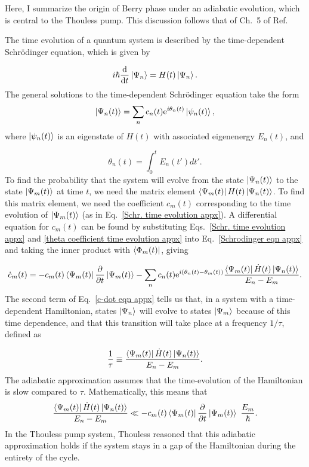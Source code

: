 \documentclass[double,12pt,1in,seploa]{beavtex}
\begin{document}
Here, I summarize the origin of Berry phase under an adiabatic evolution, which is central to the Thouless pump. This discussion follows that of Ch.\ 5 of Ref.\ \cite{sakurai_modern_1985}

The time evolution of a quantum system is described by the time-dependent Schrödinger equation, which is given by

\begin{equation}
    i \hbar \derivative{t}\ket{\Psi_n} = H(t)\ket{\Psi_n}. \label{Schrodinger eqn appx}
\end{equation}
The general solutions to the time-dependent Schrödinger equation take the form
\begin{equation}
    \ket{\Psi_n(t)} = \sum_n c_n(t) \mathrm{e}^{i \theta_n(t)} \ket{\psi_n(t)}, \label{Schr. time evolution appx}
\end{equation}
where $\ket{\psi_n(t)}$ is an eigenstate of $H(t)$ with associated eigenenergy $E_n(t)$, and 

\begin{equation}
    \theta_n(t) = \int_{0}^{t}E_n(t')dt'. \label{theta coefficient time evolution appx}
\end{equation}
To find the probability that the system will evolve from the state $\ket{\Psi_n(t)}$ to the state $\ket{\Psi_m(t)}$ at time $t$, we need the matrix element $\bra{\Psi_m(t)}H(t)\ket{\Psi_n(t)}$. To find this matrix element, we need the coefficient $c_m(t)$ corresponding to the time evolution of $\ket{\Psi_m(t)}$ (as in Eq.\ \ref{Schr. time evolution appx}). A differential equation for $c_m(t)$ can be found by substituting Eqs.\ \ref{Schr. time evolution appx} and \ref{theta coefficient time evolution appx} into Eq.\ \ref{Schrodinger eqn appx} and taking the inner product with $\bra{\Phi_m(t)}$, giving \cite[p.\ 347]{sakurai_modern_1985}

\begin{equation}
    \dot{c}_m(t) = - c_m(t) \bra{\Psi_m(t)}\pdv{t}\ket{\Psi_m(t)} - \sum_n c_n(t) \mathrm{e}^{i (\theta_n(t) - \theta_m(t))} \frac{\bra{\Psi_m(t)}\dot{H}(t)\ket{\Psi_n(t)}}{E_n - E_m}. \label{c-dot eqn appx}
\end{equation}
The second term of Eq.\ \ref{c-dot eqn appx} tells us that, in a system with a time-dependent Hamiltonian, states $\ket{\Psi_n}$ will evolve to states $\ket{\Psi_m}$ because of this time dependence, and that this transition will take place at a frequency $1/\tau$, defined as 

\begin{equation}
    \frac{1}{\tau} \equiv \frac{\bra{\Psi_m(t)}\dot{H}(t)\ket{\Psi_n(t)}}{E_n - E_m}.
\end{equation}
The adiabatic approximation assumes that the time-evolution of the Hamiltonian is slow compared to $\tau$. Mathematically, this means that
\begin{equation}
    \frac{\bra{\Psi_m(t)}\dot{H}(t)\ket{\Psi_n(t)}}{E_n - E_m} \ll - c_m(t) \bra{\Psi_m(t)}\pdv{t}\ket{\Psi_m(t)} ~ \frac{E_m}{\hbar}. \label{adiabatic approximation condition appx}
\end{equation}
In the Thouless pump system, Thouless reasoned that this adiabatic approximation holds if the system stays in a gap of the Hamiltonian during the entirety of the cycle.
\end{document}
